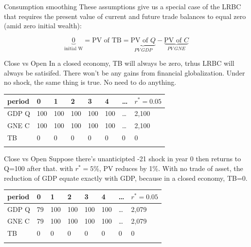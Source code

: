 \documentclass[
  ignorenonframetext,
]{beamer}
\begin{document}
\begin{frame}{Consumption smoothing}
\label{consumption-smoothing-3}
These assumptions give us a special case of the LRBC that requires the
present value of current and future trade balances to equal zero (amid
zero initial wealth):

\[
\underbrace{0}_{\text{initial W}}=\text{PV of TB}=\underbrace{\text{PV of } Q}_{PV \  GDP}-\underbrace{\text{PV of } C}_{PV \ GNE}
\]
\end{frame}

\begin{frame}{Close vs Open}
\label{close-vs-open-1}
In a closed economy, TB will always be zero, trhus LRBC will always be
satisifed. There won't be any gains from financial globalization. Under
no shock, the same thing is true. No need to do anything.

\begin{longtable}[]{@{}llllllll@{}}
\toprule\noalign{}
period & 0 & 1 & 2 & 3 & 4 & \ldots{} & \(r^*=0.05\) \\
\midrule\noalign{}
\endhead
GDP Q & 100 & 100 & 100 & 100 & 100 & \ldots{} & 2,100 \\
GNE C & 100 & 100 & 100 & 100 & 100 & \ldots{} & 2,100 \\
TB & 0 & 0 & 0 & 0 & 0 & 0 & 0 \\
\bottomrule\noalign{}
\end{longtable}
\end{frame}

\begin{frame}{Close vs Open}
\label{close-vs-open-2}
Suppose there's unanticipted -21 shock in year 0 then returns to Q=100
after that. with \(r^*=5\%\), PV reduces by 1\%. With no trade of asset,
the reduction of GDP equate exactly with GDP, because in a closed
economy, TB=0.

\begin{longtable}[]{@{}llllllll@{}}
\toprule\noalign{}
period & 0 & 1 & 2 & 3 & 4 & \ldots{} & \(r^*=0.05\) \\
\midrule\noalign{}
\endhead
GDP Q & 79 & 100 & 100 & 100 & 100 & \ldots{} & 2,079 \\
GNE C & 79 & 100 & 100 & 100 & 100 & \ldots{} & 2,079 \\
TB & 0 & 0 & 0 & 0 & 0 & 0 & 0 \\
\bottomrule\noalign{}
\end{longtable}
\end{frame}
\end{document}

